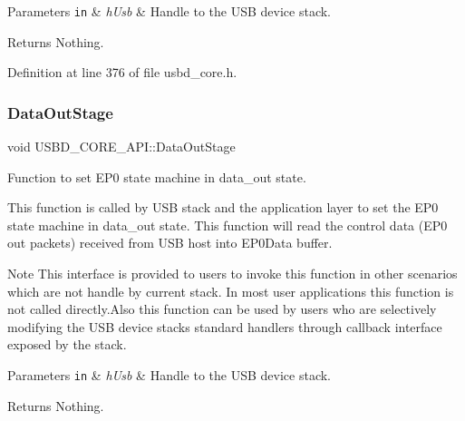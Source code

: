 \begin{DoxyParams}[1]{Parameters}
\mbox{\tt in}  & {\em h\+Usb} & Handle to the U\+SB device stack. \\
\hline
\end{DoxyParams}
\begin{DoxyReturn}{Returns}
Nothing. 
\end{DoxyReturn}


Definition at line 376 of file usbd\+\_\+core.\+h.

\mbox{\label{struct_u_s_b_d___c_o_r_e___a_p_i_ac4232f616e5ec409d0ca853bf704175f}} 
\subsubsection{\texorpdfstring{Data\+Out\+Stage}{DataOutStage}}
{\footnotesize\ttfamily void U\+S\+B\+D\+\_\+\+C\+O\+R\+E\+\_\+\+A\+P\+I\+::\+Data\+Out\+Stage}

Function to set E\+P0 state machine in data\+\_\+out state.

This function is called by U\+SB stack and the application layer to set the E\+P0 state machine in data\+\_\+out state. This function will read the control data (E\+P0 out packets) received from U\+SB host into E\+P0\+Data buffer. ~\newline
\begin{DoxyNote}{Note}
This interface is provided to users to invoke this function in other scenarios which are not handle by current stack. In most user applications this function is not called directly.\+Also this function can be used by users who are selectively modifying the U\+SB device stack\textquotesingle{}s standard handlers through callback interface exposed by the stack.
\end{DoxyNote}

\begin{DoxyParams}[1]{Parameters}
\mbox{\tt in}  & {\em h\+Usb} & Handle to the U\+SB device stack. \\
\hline
\end{DoxyParams}
\begin{DoxyReturn}{Returns}
Nothing. 
\end{DoxyReturn}


